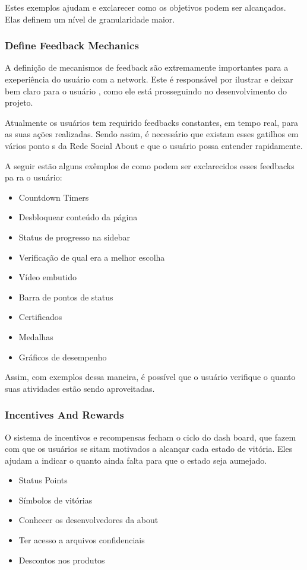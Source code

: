 Estes exemplos ajudam e exclarecer como os objetivos podem ser alcançados. Elas
definem um nível de
granularidade maior.

\subsubsection{Define Feedback Mechanics}
\label{sub:define_feedback_mechanics}
A definição de mecanismos de feedback são extremamente importantes para a exeperiência do usuário
com a network. Este é responsável por ilustrar e deixar bem claro para o usuário
, como ele está
prosseguindo no desenvolvimento do projeto.

Atualmente os usuários tem requirido feedbacks constantes, em tempo real, para as suas ações
realizadas. Sendo assim, é necessário que existam esses gatilhos em vários ponto
s da
Rede Social About e que o usuário possa entender rapidamente.

A seguir estão alguns exêmplos de como podem ser exclarecidos esses feedbacks pa ra o usuário:

\begin{itemize}
    \item Countdown Timers
    \item Desbloquear conteúdo da página
    \item Status de progresso na sidebar
    \item Verificação de qual era a melhor escolha
    \item Vídeo embutido
    \item Barra de pontos de status
    \item Certificados
    \item Medalhas
    \item Gráficos de desempenho
\end{itemize}

Assim, com exemplos dessa maneira, é possível que o usuário verifique o quanto suas atividades estão
sendo aproveitadas.

\subsubsection{Incentives And Rewards}
\label{sub:incentives_and_rewards}
O sistema de incentivos e recompensas fecham o ciclo do dash board, que fazem com que
os usuários se sitam motivados a alcançar cada estado de vitória. Eles ajudam a
indicar
o quanto ainda falta para que o estado seja aumejado.

\begin{itemize}
    \item Status Points
    \item Símbolos de vitórias
    \item Conhecer os desenvolvedores da about
    \item Ter acesso a arquivos confidenciais
    \item Descontos nos produtos
\end{itemize}

